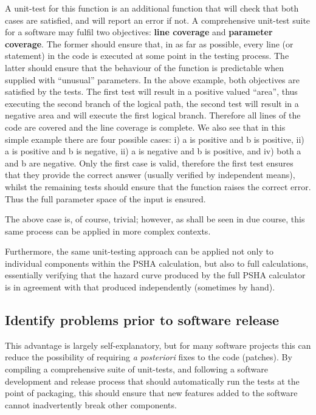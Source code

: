 A unit-test for this function is an additional function that will check that both cases are satisfied, and will report an error if not. 
A comprehensive unit-test suite for a software may fulfil two objectives: \textbf{line coverage} and \textbf{parameter coverage}. The former should ensure that, in as far as possible, every line (or statement) in the code is executed at some point in the testing process. The latter should ensure
that the behaviour of the function is predictable when supplied with ``unusual'' parameters. In the above example, both objectives are satisfied
by the tests. The first test will result in a positive valued ``area'',
thus executing the second branch of the logical path, the second test will
result in a negative area and will execute the first logical branch. %
Therefore all lines of the code are covered and the line coverage is complete. We also see that in this simple example there are four possible
cases: i) a is positive and b is positive, ii) a is positive and b is negative,  ii) a is negative and b is positive, and iv) both a and b are negative. Only the first case is valid, therefore the first test ensures that they provide the correct answer (usually verified by independent means), whilst the remaining tests should ensure that the function raises the correct error. Thus the full parameter space of the input is ensured.

The above case is, of course, trivial; however, as shall be seen in due
course, this same process can be applied in more complex contexts.

Furthermore, the same unit-testing approach can be applied not only to individual components within the PSHA calculation, but also to full calculations, essentially verifying that the hazard curve produced by the full PSHA calculator is in agreement with that produced independently (sometimes by hand).


\subsection{Identify problems prior to software release}
This advantage is largely self-explanatory, but for many software projects this can reduce the possibility of requiring \emph{a posteriori} fixes to the code (patches). By compiling a comprehensive suite of unit-tests, and following a software development and release process that should automatically run the tests at the point of packaging, this should ensure that new features added to the software cannot inadvertently break other components.


